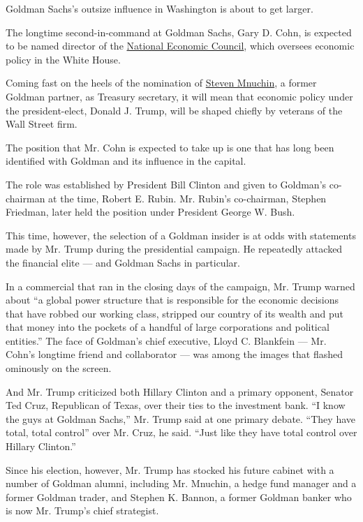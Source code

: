 Goldman Sachs's outsize influence in Washington is about to get larger.

The longtime second-in-command at Goldman Sachs, Gary D. Cohn, is
expected to be named director of the
\href{https://www.whitehouse.gov/administration/eop/nec}{National
Economic Council}, which oversees economic policy in the White House.

Coming fast on the heels of the nomination of
\href{https://www.nytimes.com/2016/11/29/us/politics/steven-terner-mnuchin-trump-treasury-secretary.html}{Steven
Mnuchin}, a former Goldman partner, as Treasury secretary, it will mean
that economic policy under the president-elect, Donald J. Trump, will be
shaped chiefly by veterans of the Wall Street firm.

The position that Mr. Cohn is expected to take up is one that has long
been identified with Goldman and its influence in the capital.

The role was established by President Bill Clinton and given to
Goldman's co-chairman at the time, Robert E. Rubin. Mr. Rubin's
co-chairman, Stephen Friedman, later held the position under President
George W. Bush.

This time, however, the selection of a Goldman insider is at odds with
statements made by Mr. Trump during the presidential campaign. He
repeatedly attacked the financial elite --- and Goldman Sachs in
particular.

In a commercial that ran in the closing days of the campaign, Mr. Trump
warned about ``a global power structure that is responsible for the
economic decisions that have robbed our working class, stripped our
country of its wealth and put that money into the pockets of a handful
of large corporations and political entities.'' The face of Goldman's
chief executive, Lloyd C. Blankfein --- Mr. Cohn's longtime friend and
collaborator --- was among the images that flashed ominously on the
screen.

And Mr. Trump criticized both Hillary Clinton and a primary opponent,
Senator Ted Cruz, Republican of Texas, over their ties to the investment
bank. ``I know the guys at Goldman Sachs,'' Mr. Trump said at one
primary debate. ``They have total, total control'' over Mr. Cruz, he
said. ``Just like they have total control over Hillary Clinton.''

Since his election, however, Mr. Trump has stocked his future cabinet
with a number of Goldman alumni, including Mr. Mnuchin, a hedge fund
manager and a former Goldman trader, and Stephen K. Bannon, a former
Goldman banker who is now Mr. Trump's chief strategist.

